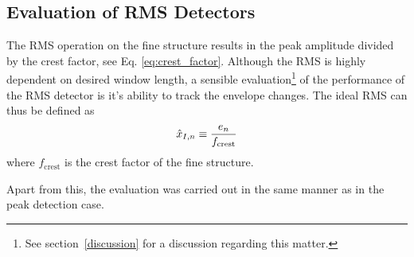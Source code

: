 \documentclass[../main2.tex]{subfiles}
\begin{document}
\subsection{Evaluation of RMS Detectors}\label{method_rms_detectors}
The RMS operation on the fine structure results in the peak amplitude divided by the crest factor, see Eq. \eqref{eq:crest_factor}. Although the RMS is highly dependent on desired window length, a sensible evaluation\footnote{See section~\ref{discussion} for a discussion regarding this matter.} of the performance of the RMS detector is it's ability to track the envelope changes. The ideal RMS can thus be defined as
\begin{align}
\hat{x}_{I,n} \equiv \frac{e_n}{f_\text{crest}}
\end{align}
where $f_\text{crest}$ is the crest factor of the fine structure.

Apart from this, the evaluation was carried out in the same manner as in the peak detection case.
\end{document}
